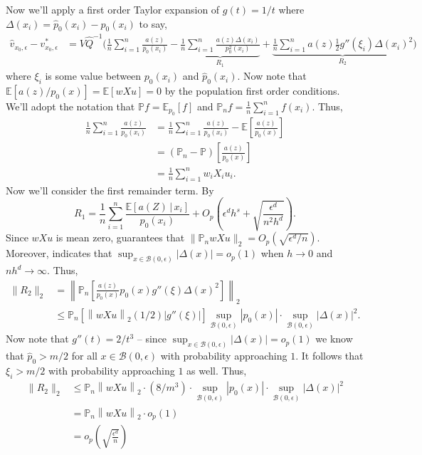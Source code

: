 \documentclass[11pt]{article}
\begin{document}
Now we'll apply a first order Taylor expansion of $g(t) = 1/t$ where $\Delta(x_i) = \hat{p}_0(x_i) - p_0(x_i)$ to say,
\begin{align}
    \hat{v}_{x_0, \epsilon} - v^*_{x_0, \epsilon} &= V\hat{Q}^{-1}\bigg(\frac{1}{n}\sum_{i = 1}^n\frac{a(z)}{p_0(x_i)} - \underbrace{\frac{1}{n}\sum_{i = 1}^n\frac{a(z)\Delta(x_i)}{p_0^2(x_i)}}_{R_1} + \underbrace{\frac{1}{n}\sum_{i = 1}^na(z) \frac{1}{2}g''(\xi_i)\Delta(x_i)^2}_{R_2}\bigg) \label{eq: expansion with remainder}
\end{align}
where $\xi_i$ is some value between $p_0(x_i)$ and $\hat{p}_0(x_i)$. Now note that $\mathbb{E}[a(z)/p_0(x)] = \mathbb{E}[wXu] = 0$ by the population first order conditions. We'll adopt the notation that $\mathbb{P}f = \mathbb{E}_{p_0}[f]$ and $\mathbb{P}_nf = \frac{1}{n}\sum_{i = 1}^nf(x_i)$. Thus,
\begin{align*}
    \frac{1}{n}\sum_{i = 1}^n\frac{a(z)}{p_0(x_i)} &= \frac{1}{n}\sum_{i = 1}^n\frac{a(z)}{p_0(x_i)} - \mathbb{E}\left[\frac{a(z)}{p_0(x)}\right] \\
    &= (\mathbb{P}_n -\mathbb{P})\left[\frac{a(z)}{p_0(x)}\right] \\
    &= \frac{1}{n}\sum_{i = 1}^n w_i X_i u_i.
\end{align*}
Now we'll consider the first remainder term. By 
\[R_1 = \frac{1}{n}\sum_{i = 1}^n \frac{\mathbb{E}[a(Z)\,| \,x_i]}{p_0(x_i)} + O_p\left( \epsilon^dh^s + \sqrt{\frac{\epsilon^d}{n^2h^d}}\right).\]
Since $wXu$ is mean zero,  guarantees that $\|\mathbb{P}_nwXu\|_2 = O_p(\sqrt{\epsilon^d/n})$. Moreover,  indicates that $\sup_{x\in \mathcal{B}(0, \epsilon)} \left|\Delta(x)\right| = o_p(1)$ when $h \rightarrow 0$ and $nh^d \rightarrow \infty$. Thus, 
\begin{align*}
    \|R_2\|_2 &= \left\|\mathbb{P}_n\left[\frac{a(z)}{p_0(x)}p_0(x)g''(\xi)\Delta(x)^2\right]\right\|_2\\
    &\leq \mathbb{P}_n[\left\|wXu\right\|_2(1/2)|g''(\xi)|]\sup_{\mathcal{B}(0, \epsilon)}|p_0(x)|\cdot \sup_{\mathcal{B}(0, \epsilon)}|\Delta(x)|^2. 
\end{align*}
Now note that $g''(t) = 2/t^3$  -- since $\sup_{x\in \mathcal{B}(0, \epsilon)} \left|\Delta(x)\right| = o_p(1)$ we know that $\hat{p}_0 > m/2$ for all $x \in \mathcal{B}(0, \epsilon)$ with probability approaching $1$. It follows that $\xi_i > m/2$ with probability approaching $1$ as well. Thus,
\begin{align*}
    \|R_2\|_2 &\leq \mathbb{P}_n\left\|wXu\right\|_2\cdot (8/m^3)\cdot \sup_{\mathcal{B}(0, \epsilon)}|p_0(x)|\cdot \sup_{\mathcal{B}(0, \epsilon)}|\Delta(x)|^2 \\
    &= \mathbb{P}_n\left\|wXu\right\|_2 \cdot o_p(1) \\
    &= o_p\left(\sqrt{\frac{\epsilon^d}{n}}\right)
\end{align*}
\end{document}
